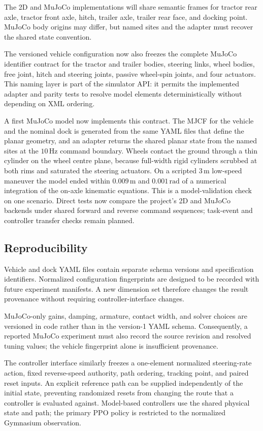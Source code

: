 The 2D and MuJoCo implementations will share semantic frames for tractor rear
axle, tractor front axle, hitch, trailer axle, trailer rear face, and docking
point. MuJoCo body origins may differ, but named sites and the adapter must
recover the shared state convention.

The versioned vehicle configuration now also freezes the complete MuJoCo
identifier contract for the tractor and trailer bodies, steering links, wheel
bodies, free joint, hitch and steering joints, passive wheel-spin joints, and
four actuators. This naming layer is part of the simulator API: it permits the
implemented adapter and parity tests to resolve model elements deterministically
without depending on XML ordering.

A first MuJoCo model now implements this contract. The MJCF for the vehicle
and the nominal dock is generated from the same YAML files that define the
planar geometry, and an adapter returns the shared planar state from the named
sites at the $10\,\mathrm{Hz}$ command boundary. Wheels contact the ground
through a thin cylinder on the wheel centre plane, because full-width rigid
cylinders scrubbed at both rims and saturated the steering actuators. On a
scripted $3\,\mathrm{m}$ low-speed maneuver the model ended within
$0.009\,\mathrm{m}$ and $0.001\,\mathrm{rad}$ of a numerical integration of
the on-axle kinematic equations. This is a model-validation check on one
scenario. Direct tests now compare the project's 2D and MuJoCo backends under
shared forward and reverse command sequences; task-event and controller
transfer checks remain planned.

\subsection{Reproducibility}

Vehicle and dock YAML files contain separate schema versions and specification
identifiers. Normalized configuration fingerprints are designed to be recorded
with future experiment manifests. A new dimension set therefore changes the
result provenance without requiring controller-interface changes.

MuJoCo-only gains, damping, armature, contact width, and solver choices are
versioned in code rather than in the version-1 YAML schema. Consequently, a
reported MuJoCo experiment must also record the source revision and resolved
tuning values; the vehicle fingerprint alone is insufficient provenance.

The controller interface similarly freezes a one-element normalized
steering-rate action, fixed reverse-speed authority, path ordering, tracking
point, and paired reset inputs. An explicit reference path can be supplied
independently of the initial state, preventing randomized resets from changing
the route that a controller is evaluated against. Model-based controllers use
the shared physical state and path; the primary PPO policy is restricted to the
normalized Gymnasium observation.
